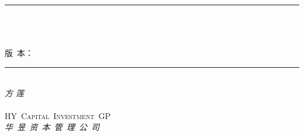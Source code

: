 \newpage
\thispagestyle{empty}
~

\begin{titlepage}
\begin{center}
{\hrule height 2pt}\ \\[5pt]
{\fontsize{30}{35}\selectfont {}}\\[8pt]
{\fontsize{36}{42} }\\[8pt]
\normalsize 版\ 本：\  \ \lnotesversion\\[20pt]
{\hrule height 2pt}\  \\[100pt]

\huge \textit{方 \hspace{2pt} 莲}\\[8pt]
\Large \lnotesdate\\[200pt]

\textsc{HY\ Capital\ Investment\ GP}\\[8pt]
\huge \textit{华\ 昱\ 资\ 本\ 管\ 理\ 公\ 司}
\normalsize
\end{center}
\end{titlepage}
